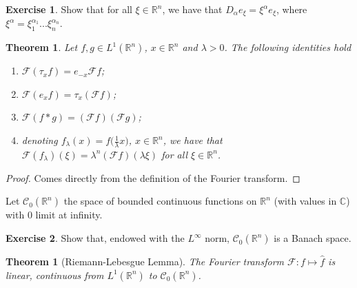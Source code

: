 \documentclass[a4paper, 12pt]{article}
\theoremstyle{plain}
\newtheorem{theorem}[proposition]{Theorem}
\theoremstyle{definition}
\newtheorem{exercise}{Exercise}
\theoremstyle{remark}
\numberwithin{equation}{section}
\begin{document}
\begin{exercise}
Show that for all $\xi\in{\mathds{R}}^n$, we have that
 $D_\alpha e_\xi = \xi^\alpha e_\xi$, where $\xi^\alpha = \xi_1^{\alpha_1} ... \xi_n^{\alpha_n}$.
\end{exercise}

\begin{theorem} 
\label{thm:Fourier1}
Let $f,g \in L^1({\mathds{R}}^n)$, $x\in {\mathds{R}}^n$ and $\lambda >0$. The following identities hold
%
\begin{enumerate}
\item
${\mathscr{F}} (\tau_x f) = e_{-x} {\mathscr{F}} f$;
\item
${\mathscr{F}}(e_x f) = \tau_x ({\mathscr{F}} f)$; 
\item
${\mathscr{F}}(f*g) = ({\mathscr{F}} f) ({\mathscr{F}} g)$;
\item
denoting $f_\lambda(x) = f\bigl(\frac{1}{\lambda}x\bigr)$, $x \in {\mathds{R}}^n$, we have that 
${\mathscr{F}}( f_\lambda) (\xi) = \lambda^n ({\mathscr{F}} f)(\lambda \xi)$ for all $\xi \in {\mathds{R}}^n$.
\end{enumerate} 
\end{theorem}

\begin{proof}
Comes directly from the definition of the Fourier transform.
\end{proof}

Let ${\mathscr{C}}_0({\mathds{R}}^n)$ the space of bounded continuous functions on ${\mathds{R}}^n$ (with values in ${\mathds{C}}$)
with 0 limit at infinity.

\begin{exercise}
Show that, endowed with the $L^\infty$ norm, ${\mathscr{C}}_0({\mathds{R}}^n)$ is a Banach space.
\end{exercise}

\begin{theorem}[Riemann-Lebesgue Lemma]
\label{thm:RL}
The Fourier transform ${\mathscr{F}}:f \mapsto \hat{f}$ is linear, continuous from $L^1({\mathds{R}}^n)$ to ${\mathscr{C}}_0({\mathds{R}}^n)$.
\end{theorem}
\end{document}
